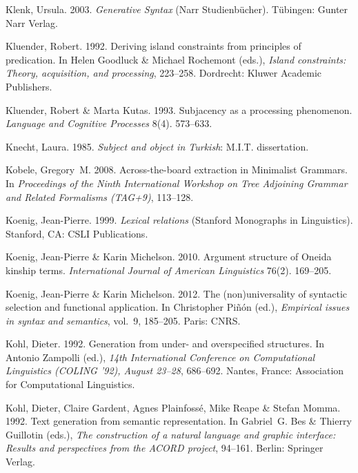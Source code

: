 \begin{thebibliography}{1420}
Klenk, Ursula. 2003.
\newblock \emph{{Generative Syntax}}  (Narr Studienb{\"u}cher).
\newblock T{\"u}bingen: Gunter Narr Verlag.

Kluender, Robert. 1992.
\newblock Deriving island constraints from principles of predication.
\newblock In Helen Goodluck \& Michael Rochemont (eds.), \emph{Island
  constraints: {Theory}, acquisition, and processing}, 223--258. Dordrecht:
  Kluwer Academic Publishers.

Kluender, Robert \& Marta Kutas. 1993.
\newblock Subjacency as a processing phenomenon.
\newblock \emph{Language and Cognitive Processes} 8(4). 573--633.

Knecht, Laura. 1985.
\newblock \emph{Subject and object in {Turkish}}: M.I.T. dissertation.

Kobele, Gregory~M. 2008.
\newblock Across-the-board extraction in {Minimalist Grammars}.
\newblock In \emph{Proceedings of the {Ninth International Workshop on Tree
  Adjoining Grammar and Related Formalisms (TAG+9)}}, 113--128.

Koenig, Jean-Pierre. 1999.
\newblock \emph{Lexical relations}  (Stanford Monographs in Linguistics).
\newblock Stanford, CA: CSLI Publications.

Koenig, Jean-Pierre \& Karin Michelson. 2010.
\newblock Argument structure of {Oneida} kinship terms.
\newblock \emph{International Journal of American Linguistics} 76(2). 169--205.

Koenig, Jean-Pierre \& Karin Michelson. 2012.
\newblock The (non)universality of syntactic selection and functional
  application.
\newblock In Christopher Pi{\~n}{\'o}n (ed.), \emph{Empirical issues in syntax
  and semantics}, vol.~9, 185--205. Paris: CNRS.

Kohl, Dieter. 1992.
\newblock Generation from under- and overspecified structures.
\newblock In Antonio Zampolli (ed.), \emph{{14th International Conference on
  Computational Linguistics (COLING '92), August 23--28}}, 686--692. Nantes,
  France: Association for Computational Linguistics.

Kohl, Dieter, Claire Gardent, Agnes Plainfoss{\'e}, Mike Reape \& Stefan Momma.
  1992.
\newblock Text generation from semantic representation.
\newblock In Gabriel~G. Bes \& Thierry Guillotin (eds.), \emph{The construction
  of a natural language and graphic interface: {Results} and perspectives from
  the {ACORD} project}, 94--161. Berlin: Springer Verlag.


\end{thebibliography}
